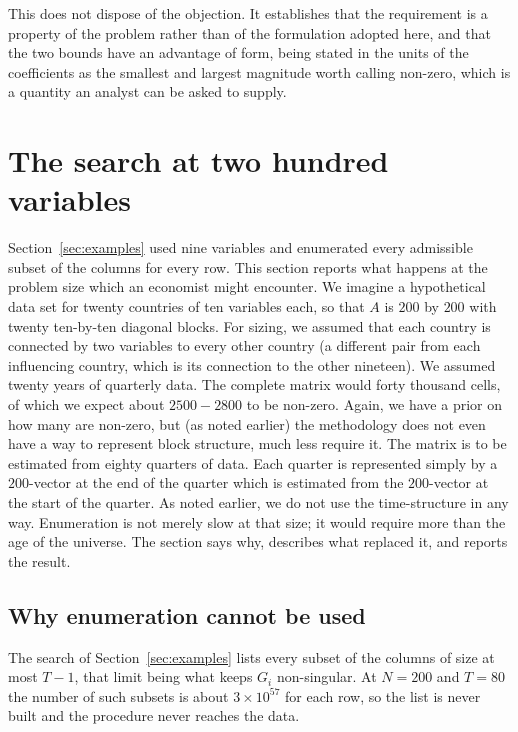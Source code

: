 This does not dispose of the objection. It establishes that the requirement is a
property of the problem rather than of the formulation adopted here, and that the two
bounds have an advantage of form, being stated in the units of the coefficients as
the smallest and largest magnitude worth calling non-zero, which is a quantity an
analyst can be asked to supply.

\section{The search at two hundred variables}
\label{sec:large}

Section~\ref{sec:examples} used nine variables and enumerated every admissible
subset of the columns for every row. This section reports what happens at the problem size
which  an economist might encounter. We imagine a hypothetical
data set for twenty countries of ten variables each,
so that $A$ is $200$ by $200$ with twenty ten-by-ten diagonal blocks.
For sizing, we assumed that each country is connected by two variables
to every other country (a different pair from each influencing country,
which is its connection to the other nineteen). We assumed
twenty years of quarterly data.
The complete matrix would forty thousand cells, of which we expect about $2500-2800$ to be non-zero.
Again, we have a prior on how many are non-zero, but (as noted earlier) the methodology
does not even have a way to represent block structure, much less require it.
The matrix is to be estimated from eighty quarters of data. Each quarter is
represented simply by a $200$-vector at the end of the quarter which is estimated
from the $200$-vector at the start of the quarter. As noted earlier, we do not use the time-structure in any way.
Enumeration is not merely slow at that size; it would require more than
the age of the universe. The section says why, describes what replaced it,
and reports the result.

\subsection{Why enumeration cannot be used}

The search of Section~\ref{sec:examples} lists every subset of the columns of size
at most $T-1$, that limit being what keeps $G_{i}$ non-singular. At $N = 200$ and
$T = 80$ the number of such subsets is about $3 \times 10^{57}$ for each row, so the
list is never built and the procedure never reaches the data.

